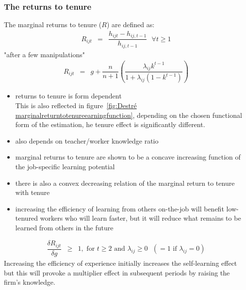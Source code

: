 \documentclass[12pt,a4paper]{article}
\begin{document}
  \subsubsection{The returns to tenure} %
  \label{ssub:The returns to tenure}
  The marginal returns to tenure ($R$) are defined as:
  \begin{eqnarray*}
    R_{ijt} &=& \dfrac{h_{ijt}- h_{ij,t-1}}{h_{ij,t-1}} \mbox{  } \forall t \geq 1
  \end{eqnarray*}
  "after a few manipulations"
  \begin{eqnarray}
    R_{ijt} &=& g + \dfrac{n}{n+1} \left( \dfrac{\lambda_{ij} k^{t-1}}{1+\lambda_{ij}(1-k^{t-1})} \right)
  \end{eqnarray}
  \begin{itemize}
    \item returns to tenure is form dependent\\
          This is also reflected in figure~\ref{fig:Destré marginalreturntotenureearningfunction}, depending
          on the chosen functional form of the estimation, he tenure effect is significantly different.
    \item also depends on teacher/worker knowledge ratio
    \item marginal returns to tenure are shown to be a concave increasing function of the
      job-specific learning potential
    \item there is also a convex decreasing relation of the marginal return to tenure with tenure
    \item increasing the efficiency of learning from others on-the-job will benefit low-tenured
      workers who will learn faster, but it will reduce what remains to be learned from others in
      the future
  \end{itemize}
  \begin{eqnarray*}
    \dfrac{\delta R_{ijt}}{\delta g} & \geq & 1, \mbox{  for  } t \geq 2 \mbox{  and  }
    \lambda_{ij} \geq 0 \mbox{  } (=1 \mbox{  if  } \lambda_{ij}=0)
  \end{eqnarray*}
  Increasing the efficiency of experience initially increases the self-learning effect but this will
  provoke a multiplier effect in subsequent periods by raising the firm's knowledge.
\end{document}
